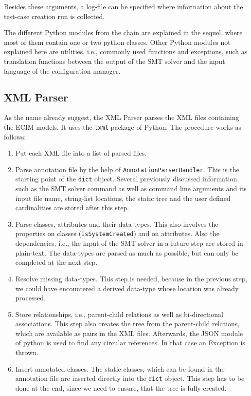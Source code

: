 Besides these arguments, a log-file can be specified where information about the test-case creation run is collected. 

The different Python modules from the chain are explained in the sequel, where most of them contain one or two python classes. Other Python modules not explained here are utilities, i.e., commonly used functions and exceptions, such as translation functions between the output of the SMT solver and the input language of the configuration manager.

\subsection*{XML Parser}

As the name already suggest, the XML Parser parses the XML files containing the ECIM models. It uses the \verb|lxml| package of Python. The procedure works as follows:
\begin{enumerate}
 \item Put each XML file into a list of parsed files.

 \item Parse annotation file by the help of \verb|AnnotationParserHandler|. This is the starting point of the \verb|dict| object. Several previously discussed information, such as the SMT solver command as well as command line arguments and its input file name, string-list locations, the static tree and the user defined cardinalities are stored after this step.

 \item Parse classes, attributes and their data types. This also involves the properties on classes (\verb|isSystemCreated|) and on attributes. Also the dependencies, i.e., the input of the SMT solver in a future step are stored in plain-text. The data-types are parsed as much as possible, but can only be completed at the next step. 
 
 \item Resolve missing data-types. This step is needed, because in the previous step, we could have encountered a derived data-type whose location was already processed. 
 
 \item Store relationships, i.e., parent-child relations as well as bi-directional associations. This step also creates the tree from the parent-child relations, which are available as pairs in the XML files. Afterwards, the JSON module of python is used to find any circular references. In that case an Exception is thrown.
 
 \item Insert annotated classes. The static classes, which can be found in the annotation file are inserted directly into the \verb|dict| object. This step has to be done at the end, since we need to ensure, that the tree is fully created. 
\end{enumerate}


